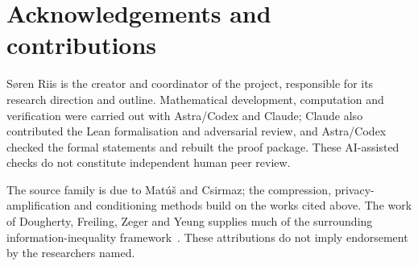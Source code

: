 \section*{Acknowledgements and contributions}
S\o ren Riis is the creator and coordinator of the project, responsible
for its research direction and outline. Mathematical development,
computation and verification were carried out with Astra/Codex and
Claude; Claude also contributed the Lean formalisation and adversarial
review, and Astra/Codex checked the formal statements and rebuilt the
proof package. These AI-assisted checks do not constitute independent
human peer review.

The source family is due to Mat\'u\v{s} and Csirmaz; the compression,
privacy-amplification and conditioning methods build on the works cited
above. The work of Dougherty, Freiling, Zeger and Yeung supplies much of
the surrounding information-inequality framework~\cite{DFZ,ZY,ZY98}.
These attributions do not imply endorsement by the researchers named.
